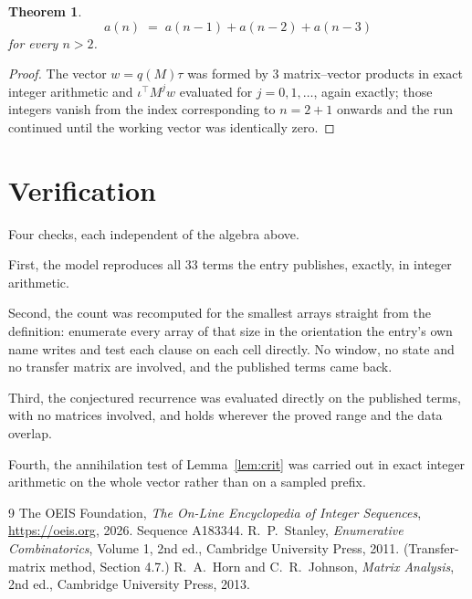 \documentclass[11pt,a4paper]{article}
\theoremstyle{plain}
\newtheorem{theorem}{Theorem}
\theoremstyle{definition}
\begin{document}
\begin{theorem}
\[
a(n)\;=\;a(n-1) + a(n-2) + a(n-3)
\]
for every $n>2$.
\end{theorem}

\begin{proof}
The vector $w=q(M)\tau$ was formed by $3$ matrix--vector products in exact integer
arithmetic and $\iota^{\!\top}M^{j}w$ evaluated for $j=0,1,\dots$, again exactly; those
integers vanish from the index corresponding to $n=2+1$ onwards and the run continued
until the working vector was identically zero.
\end{proof}

\section{Verification}

Four checks, each independent of the algebra above.

First, the model reproduces all $33$ terms the entry publishes, exactly, in integer
arithmetic.

Second, the count was recomputed for the smallest arrays straight from the definition:
enumerate every array of that size in the orientation the entry's own name writes and test each
clause on each cell directly. No window, no state and no transfer matrix are involved, and the
published terms came back.

Third, the conjectured recurrence was evaluated directly on the published terms, with no
matrices involved, and holds wherever the proved range and the data overlap.

Fourth, the annihilation test of Lemma~\ref{lem:crit} was carried out in exact integer
arithmetic on the whole vector rather than on a sampled prefix.

\begin{thebibliography}{9}
 The OEIS Foundation, \emph{The On-Line Encyclopedia of Integer
Sequences}, \url{https://oeis.org}, 2026. Sequence A183344.
 R.~P.~Stanley, \emph{Enumerative Combinatorics}, Volume 1, 2nd ed.,
Cambridge University Press, 2011. (Transfer-matrix method, Section 4.7.)
 R.~A.~Horn and C.~R.~Johnson, \emph{Matrix Analysis}, 2nd ed., Cambridge
University Press, 2013.
\end{thebibliography}
\end{document}
